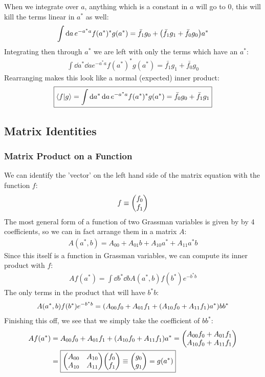\documentclass[12pt]{article}
\newcommand{\A}{\hat{A}}
\begin{document}
When we integrate over $a$, anything which is a constant in $a$ will go to $0$, this will kill the terms linear in $a^*$ as well:
\begin{align*}
  \int\dd{a}e^{-a^*a}f(a^*)^*g(a^*)=\bar{f_1}g_0+\qty(\bar{f_1}g_1+\bar{f_0}g_0)a^*
\end{align*}
Integrating then through $a^*$ we are left with only the terms which have an $a^*$:
\begin{align*}
  \int\dd{a^*}\dd{a}e^{-a^*a}f(a^*)^*g(a^*)=\bar{f_1}g_1+\bar{f_0}g_0
\end{align*}
Rearranging makes this look like a normal (expected) inner product:
\begin{align*}
  \boxed{
    \ip{f}{g}=\int\dd{a^*}\dd{a}e^{-a^*a}f(a^*)^*g(a^*)=\bar{f_0}g_0+\bar{f_1}g_1}
\end{align*}
\subsection{Matrix Identities}
\subsubsection{Matrix Product on a Function}
We can identify the 'vector' on the left hand side of the matrix equation with the function $f$:
\begin{align*}
  f\equiv\mqty(f_0\\f_1)
\end{align*}
The most general form of a function of two Grassman variables is given by by 4 coefficients, so we can in fact arrange them in a matrix $A$:
\begin{align*}
  A(a^*,b)=A_{00}+A_{01}b+A_{10}a^*+A_{11}a^*b
\end{align*}
Since this itself is a function in Grassman variables, we can compute its inner product with $f$:
\begin{align*}
  Af(a^*)=\int\dd{b^*}\dd{b} A(a^*,b)f(b^*)e^{-b^*b}
\end{align*}
The only terms in the product that will have $b^*b$:
\begin{align*}
  A(a^*,b)f(b^*)e^{-b^*b}=\qty(A_{00}f_0+A_{01}f_1+\qty(A_{10}f_0+A_{11}f_1)a^*)bb^*
\end{align*}
Finishing this off, we see that we simply take the coefficient of $bb^*$:
\begin{align*}
  Af(a^*)&=A_{00}f_0+A_{01}f_1+\qty(A_{10}f_0+A_{11}f_1)a^*=
  \mqty(A_{00}f_0+A_{01}f_1\\A_{10}f_0+A_{11}f_1)\\
  &=\boxed{
    \mqty(A_{00}&A_{10}\\A_{10}&A_{11})\mqty(f_0\\f_1)\equiv \mqty(g_0\\g_1)=g(a^*)}
\end{align*}
\end{document}
